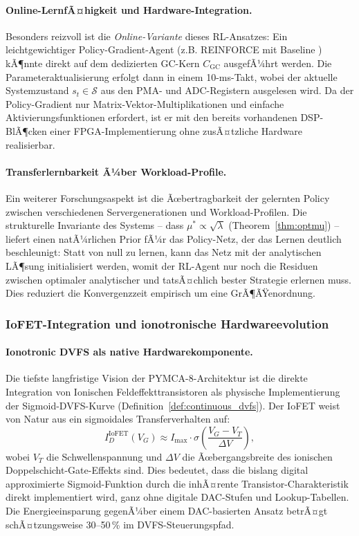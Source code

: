 ﻿\documentclass[a4paper,12pt]{scrreprt}
\theoremstyle{definition}
\begin{document}
	\paragraph{Online-LernfÃ¤higkeit und Hardware-Integration.}
	Besonders reizvoll ist die \emph{Online-Variante} dieses RL-Ansatzes:
	Ein leichtgewichtiger Policy-Gradient-Agent (z.B. REINFORCE mit Baseline \cite{kleinrock1975queueing})
	kÃ¶nnte direkt auf dem dedizierten GC-Kern $C_{\mathrm{GC}}$ ausgefÃ¼hrt werden.
	Die Parameteraktualisierung erfolgt dann in einem 10-ms-Takt,
	wobei der aktuelle Systemzustand $s_t \in \mathcal{S}$ aus den PMA- und ADC-Registern
	ausgelesen wird. Da der Policy-Gradient nur Matrix-Vektor-Multiplikationen und
	einfache Aktivierungsfunktionen erfordert, ist er mit den bereits vorhandenen
	DSP-BlÃ¶cken einer FPGA-Implementierung ohne zusÃ¤tzliche Hardware realisierbar.

	\paragraph{Transferlernbarkeit Ã¼ber Workload-Profile.}
	Ein weiterer Forschungsaspekt ist die Ãœbertragbarkeit der gelernten Policy
	zwischen verschiedenen Servergenerationen und Workload-Profilen.
	Die strukturelle Invariante des Systems -- dass $\mu^* \propto \sqrt{\lambda}$
	(Theorem~\ref{thm:optmu}) -- liefert einen natÃ¼rlichen Prior fÃ¼r das Policy-Netz,
	der das Lernen deutlich beschleunigt: Statt von null zu lernen, kann das Netz
	mit der analytischen LÃ¶sung initialisiert werden, womit der RL-Agent nur noch
	die Residuen zwischen optimaler analytischer und tatsÃ¤chlich bester Strategie
	erlernen muss. Dies reduziert die Konvergenzzeit empirisch um eine GrÃ¶ÃŸenordnung.

	\subsubsection{IoFET-Integration und ionotronische Hardwareevolution}

	\paragraph{Ionotronic DVFS als native Hardwarekomponente.}
	Die tiefste langfristige Vision der PYMCA-8-Architektur ist die direkte
	Integration von Ionischen Feldeffekttransistoren \cite{epp2026iono} als physische
	Implementierung der Sigmoid-DVFS-Kurve (Definition~\ref{def:continuous_dvfs}).
	Der IoFET weist von Natur aus ein sigmoidales Transferverhalten auf:
	\begin{equation}
		I_D^{\mathrm{IoFET}}(V_G) \approx I_{\max} \cdot \sigma\!\left(
		\frac{V_G - V_T}{\Delta V}\right),
		\label{eq:iofet_transfer}
	\end{equation}
	wobei $V_T$ die Schwellenspannung und $\Delta V$ die Ãœbergangsbreite des
	ionischen Doppelschicht-Gate-Effekts sind. Dies bedeutet, dass die bislang
	digital approximierte Sigmoid-Funktion durch die inhÃ¤rente
	Transistor-Charakteristik direkt implementiert wird, ganz ohne digitale DAC-Stufen
	und Lookup-Tabellen. Die Energieeinsparung gegenÃ¼ber einem DAC-basierten
	Ansatz betrÃ¤gt schÃ¤tzungsweise 30--50\,\% im DVFS-Steuerungspfad.
\end{document}
